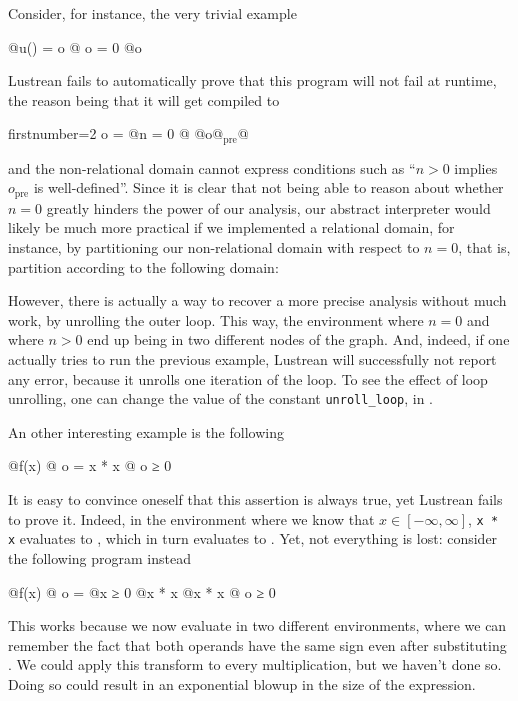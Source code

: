 \documentclass{scrartcl}
\begin{document}
Consider, for instance, the very trivial example
\begin{lustre}
@\Node@ u() = o @\Where@
  o = 0 @\Fby@ o
\end{lustre}
Lustrean fails to automatically prove that this program will not fail at runtime, the reason
being that it will get compiled to
\begin{lustre*}{firstnumber=2}
  o = @\If@ n = 0 @ @\Else@ o@${}_\textrm{pre}$@
\end{lustre*}
and the non-relational domain cannot express conditions such as ``$n > 0$ implies
$o_\textrm{pre}$ is well-defined''.  Since it is clear that not being able to reason about
whether $n=0$ greatly hinders the power of our analysis, our abstract interpreter would likely be
much more practical if we implemented a relational domain, for instance, by partitioning our
non-relational domain with respect to $n = 0$, that is, partition according to the following
domain:
\begin{center}
\end{center}

However, there is actually a way to recover a more precise analysis without much work, by
unrolling the outer loop.  This way, the environment where $n = 0$ and where $n > 0$ end up being
in two different nodes of the graph.  And, indeed, if one actually tries to run the previous
example, Lustrean will successfully not report any error, because it unrolls one iteration of the
loop.  To see the effect of loop unrolling, one can change the value of the constant
\texttt{unroll\_loop}, in .

An other interesting example is the following
\begin{lustre}
@\Node@ f(x) @\Where@
  o = x * x
@\Assert@
  o ≥ 0
\end{lustre}
It is easy to convince oneself that this assertion is always true, yet Lustrean fails to prove
it.  Indeed, in the environment where we know that \(x\in[-\infty, \infty]\), \texttt{x * x}
evaluates to \lustr{[-∞, ∞] * [-∞, ∞]}, which in turn evaluates to \lustr{[-∞, ∞]}.  Yet, not
everything is lost: consider the following program instead
\begin{lustre}
@\Node@ f(x) @\Where@
  o = @\If@ x ≥ 0 @\Then@ x * x @\Else@ x * x
@\Assert@
  o ≥ 0
\end{lustre}
This works because we now evaluate  in two different environments, where we can
remember the fact that both operands have the same sign even after substituting .  We
could apply this transform to every multiplication, but we haven't done so.  Doing so could
result in an exponential blowup in the size of the expression.
\end{document}
